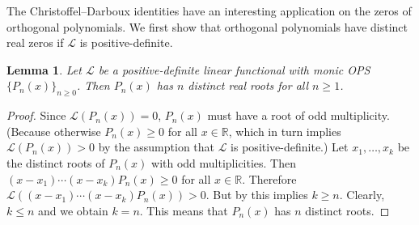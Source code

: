 \documentclass[oneside]{book}
\numberwithin{equation}{section}
\newtheorem{lem}[thm]{Lemma}
\theoremstyle{definition}
\newcommand{\RR}{\mathbb{R}}
\newcommand\LL{\mathcal{L}}
\begin{document}
The Christoffel--Darboux identities have an interesting application on
the zeros of orthogonal polynomials. We first show that orthogonal
polynomials have distinct real zeros if \( \LL \) is
positive-definite.

\begin{lem}\label{lem:real-roots}
  Let \( \LL \) be a positive-definite linear functional with monic
  OPS \( \{ P_n(x) \}_{n\ge 0} \). Then \( P_n(x) \) has \( n \)
  distinct real roots for all \( n\ge1 \).
\end{lem}

\begin{proof}
  Since \( \LL(P_n(x)) = 0 \), \( P_n(x) \) must have a root of odd
  multiplicity. (Because otherwise \( P_n(x)\ge0 \) for all
  \( x\in\RR \), which in turn implies \( \LL(P_n(x))>0 \) by the
  assumption that \( \LL \) is positive-definite.) Let
  \( x_1,\dots,x_k \) be the distinct roots of \( P_n(x) \) with odd
  multiplicities. Then \( (x-x_1) \cdots (x-x_k)P_n(x)\ge0 \) for all
  \( x\in \RR \). Therefore
  \( \LL((x-x_1) \cdots (x-x_k)P_n(x)) > 0 \). But by
   this implies \( k\ge n \). Clearly,
  \( k\le n \) and we obtain \( k=n \). This means that \( P_n(x) \)
  has \( n \) distinct roots.
\end{proof}
\end{document}

